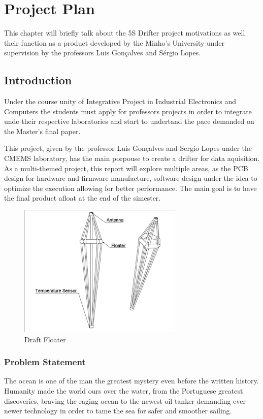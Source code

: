 \chapter{Project Plan}
    This chapter will briefly talk about the 5S Drifter project motivations as well their function as a product developed 
    by the Minho's University under supervision by the professors Luis Gonçalves and Sérgio Lopes.
\section{Introduction}
\label{sec:Introduction}
Under the course unity of Integrative Project in Industrial Electronics and Computers the students must
apply for professors projects in order to integrate unde their respective laboratories and start to undertand the pace
demanded on the Master's final paper.

This project, given by the professor Luis Gonçalves and Sergio Lopes under the CMEMS laboratory,
has the main porpouse to create a drifter for data aquisition. As a multi-themed project, this report will
explore multiple areas, as the PCB design for hardware and firmware manufacture, software design under the idea to optimize
the execution allowing for better performance. The main goal is to have the final product afloat at the end of the simester.

\begin{figure}[H]
    \centering
    \includegraphics[width=0.7\textwidth]{images/diagrams/shell/unnamed.png}  %
    \caption{Draft Floater}
    \label{fig:Draft Floater}        
\end{figure}

\subsection{Problem Statement}
\label{sec:Problem Statement}
The ocean is one of the man the greatest mystery even before the written history. Humanity made the world ours over the water, 
from the Portuguese greatest discoveries, braving the raging ocean to the newest oil tanker demanding ever newer technology
in order to tame the sea for safer and smoother sailing.

